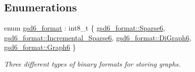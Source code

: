 \subsection*{Enumerations}
\begin{DoxyCompactItemize}
\item 
enum \hyperlink{namespacelgraph_1_1io_ad0917668d35430ffe13d455d687be4ff}{gsd6\-\_\-format} \-: int8\-\_\-t \{ \hyperlink{namespacelgraph_1_1io_ad0917668d35430ffe13d455d687be4ffaec6f468c732e372f3e518a35a9f0a084}{gsd6\-\_\-format\-::\-Sparse6}, 
\hyperlink{namespacelgraph_1_1io_ad0917668d35430ffe13d455d687be4ffaa08456aea2e82d44d7225c8058694d71}{gsd6\-\_\-format\-::\-Incremental\-\_\-\-Sparse6}, 
\hyperlink{namespacelgraph_1_1io_ad0917668d35430ffe13d455d687be4ffa216a4f5d733bff3751658293fd6bb407}{gsd6\-\_\-format\-::\-Di\-Graph6}, 
\hyperlink{namespacelgraph_1_1io_ad0917668d35430ffe13d455d687be4ffa2e43b93fa3f1c33bc0ca7890f2e9bb73}{gsd6\-\_\-format\-::\-Graph6}
 \}
\begin{DoxyCompactList}\small\item\em Three different types of binary formats for storing graphs. \end{DoxyCompactList}\end{DoxyCompactItemize}

